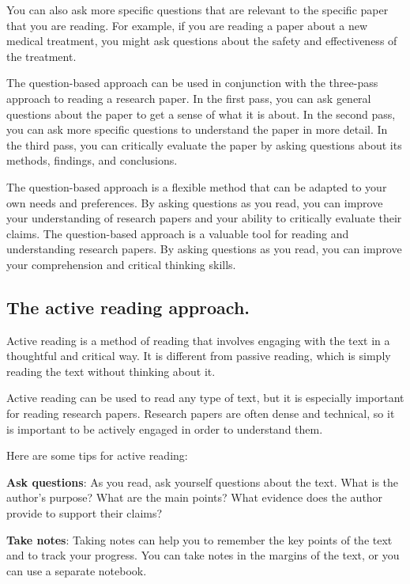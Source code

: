 \documentclass[
]{book}
\begin{document}
You can also ask more specific questions that are relevant to the specific paper that you are reading. For example, if you are reading a paper about a new medical treatment, you might ask questions about the safety and effectiveness of the treatment.

The question-based approach can be used in conjunction with the three-pass approach to reading a research paper. In the first pass, you can ask general questions about the paper to get a sense of what it is about. In the second pass, you can ask more specific questions to understand the paper in more detail. In the third pass, you can critically evaluate the paper by asking questions about its methods, findings, and conclusions.

The question-based approach is a flexible method that can be adapted to your own needs and preferences. By asking questions as you read, you can improve your understanding of research papers and your ability to critically evaluate their claims. The question-based approach is a valuable tool for reading and understanding research papers. By asking questions as you read, you can improve your comprehension and critical thinking skills.

\subsection*{The active reading approach.}\label{the-active-reading-approach.}

Active reading is a method of reading that involves engaging with the text in a thoughtful and critical way. It is different from passive reading, which is simply reading the text without thinking about it.

Active reading can be used to read any type of text, but it is especially important for reading research papers. Research papers are often dense and technical, so it is important to be actively engaged in order to understand them.

Here are some tips for active reading:

\textbf{Ask questions}: As you read, ask yourself questions about the text. What is the author's purpose? What are the main points? What evidence does the author provide to support their claims?

\textbf{Take notes}: Taking notes can help you to remember the key points of the text and to track your progress. You can take notes in the margins of the text, or you can use a separate notebook.
\end{document}
